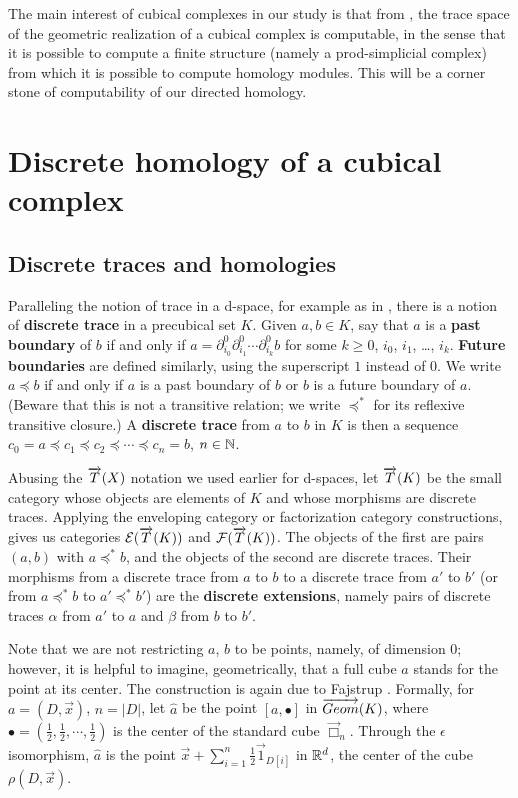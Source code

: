 The main interest of cubical complexes in our study is that from \cite{raussen12a}, the trace space of the geometric realization of a cubical complex is computable, in the sense that it is possible to compute a finite structure (namely a prod-simplicial complex) from which it is possible to compute homology modules. This will be a corner stone of computability of our directed homology.




\section{Discrete homology of a cubical complex}

\subsection{Discrete traces and homologies}
\label{subsec:distrahom}


Paralleling the notion of trace in a d-space, for example as in
\cite{fajstrup05}, there is a notion of \textbf{discrete trace} in a precubical
set $K$.  Given $a, b \in K$, say that $a$ is a \textbf{past boundary}
of $b$ if and only if $a = \partial_{i_0}^0 \partial_{i_1}^0
\cdots \partial_{i_k}^0 b$ for some $k \geq 0$, $i_0$, $i_1$, \ldots,
$i_k$.  \textbf{Future boundaries}
are defined similarly, using the superscript $1$ instead of $0$.  
We write $a \preceq b$ if and
only if $a$ is a past boundary of $b$ or $b$ is a future boundary of
$a$.  (Beware that this is not a transitive relation; we write
$\preceq^*$ for its reflexive transitive closure.)  A \textbf{discrete
  trace} from $a$ to $b$ in $K$ is then a sequence $c_0 = a \preceq
c_1 \preceq c_2 \preceq \cdots \preceq c_n = b$, $n \in \mathbb{N}$.

Abusing the $\overrightarrow{T}(X)$ notation we used earlier for d-spaces, let $\overrightarrow{T}(K)$
be the small category whose objects are elements of $K$ and whose morphisms are discrete traces. Applying the enveloping category or factorization category constructions, gives us categories $\mathcal{E}(\overrightarrow{T}(K))$ and $\mathcal{F}(\overrightarrow{T}(K))$. The objects of the first are pairs $(a,b)$ with $a \preceq^* b$, and the objects of the second are discrete traces. Their morphisms 
from a discrete trace from $a$ to $b$ to a discrete trace from $a'$ to $b'$ (or from $a \preceq^* b$ to $a' \preceq^* b'$)
are the \textbf{discrete extensions}, namely pairs of discrete
traces $\alpha$ from $a'$ to $a$ and $\beta$ from $b$ to $b'$.

Note that we are not restricting $a$, $b$ to be points, namely, of
dimension $0$; however, it is helpful to imagine, geometrically, that
a full cube $a$ stands for the point at its center.  The construction
is again due to Fajstrup \cite{fajstrup05}.  Formally, for $a = (D, \vec x)$,
$n = \lvert D \rvert$, let $\hat a$ be the point $[a, \bullet]$ in $\overrightarrow{Geom}(K)$,
where $\bullet = (\frac 1 2, \frac 1 2, \cdots, \frac 1 2)$ is the
center of the standard cube $\overrightarrow \Box_n$.  Through the
$\epsilon$ isomorphism, $\hat a$ is the point $\vec x + \sum_{i=1}^n
\frac 1 2 \vec 1_{D [i]}$ in $\mathbb{R}^d$, the center of the cube $\rho
(D, \vec x)$.

